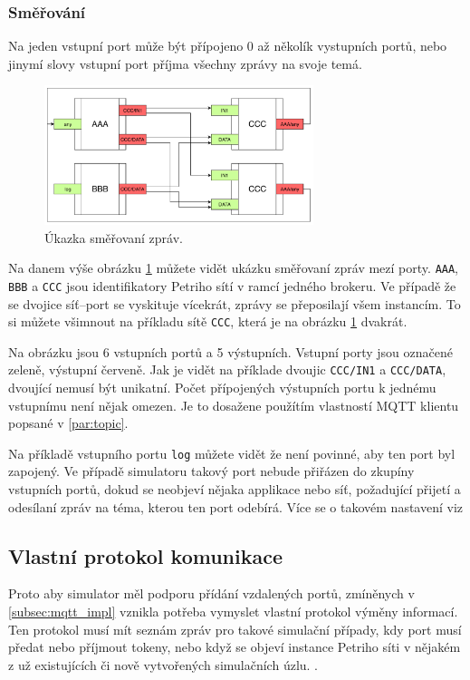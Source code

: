 \subsubsection{Směřování}
Na jeden vstupní port může být přípojeno 0 až několík vystupních portů, nebo jinymí slovy vstupní port příjma všechny zprávy na svoje temá.

\begin{figure}[htb]
  \begin{center}
    \includegraphics[width=0.7\textwidth]{obrazky-figures/Port-routing.pdf}
    \caption{Úkazka směřovaní zpráv.}
    \label{route-viz}
  \end{center}
\end{figure}

Na danem výše obrázku \ref{route-viz} můžete vidět ukázku směřovaní zpráv mezí porty. \texttt{AAA}, \texttt{BBB} a \texttt{CCC} jsou identifikatory Petriho sítí v ramcí jedného brokeru. Ve případě že se dvojice síť--port se vyskituje vícekrát, zprávy se přeposilají všem instancím. To si můžete všimnout na příkladu sítě \texttt{CCC}, která je na obrázku \ref{route-viz} dvakrát.

Na obrázku jsou 6 vstupních portů a 5 výstupních. Vstupní porty jsou označené zeleně, výstupní červeně. Jak je vidět na příklade dvoujic \texttt{CCC/IN1} a \texttt{CCC/DATA}, dvoující nemusí být unikatní. Počet přípojených výstupních portu k jednému vstupnímu není nějak omezen. Je to dosažene použítím vlastností MQTT klientu popsané v \ref{par:topic}.

Na příkladě vstupního portu \texttt{log} můžete vidět že není povinné, aby ten port byl zapojený. Ve případě simulatoru takový port nebude přiřázen do zkupíny vstupních portů, dokud se neobjeví nějaka applikace nebo síť, požadující přijetí a odesílaní zpráv na téma, kterou ten port odebírá. Více se o takovém nastavení viz 

\subsection{Vlastní protokol komunikace}
Proto aby simulator měl podporu přídání vzdalených portů, zmíněnych v \ref{subsec:mqtt_impl} vznikla potřeba vymyslet vlastní protokol výměny informací. Ten protokol musí mít seznám zpráv pro takové simulační případy, kdy port musí předat nebo příjmout tokeny, nebo když se objeví instance Petriho síti v nějakém z už existujících či nově vytvořených simulačních úzlu. .

